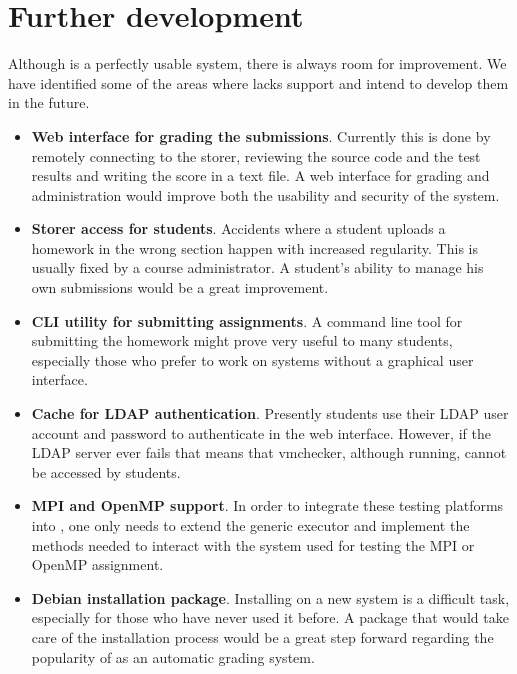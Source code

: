 \chapter{Further development}
\label{chapter:virt-devel}

Although \project is a perfectly usable system, there is always room for improvement.
We have identified some of the areas where \project lacks support and intend to
develop them in the future.

\begin{itemize}
\item {\bf Web interface for grading the submissions}. Currently this is done by
remotely connecting to the storer, reviewing the source code and the test results
and writing the score in a text file. A web interface for grading and administration
would improve both the usability and security of the system.
\item {\bf Storer access for students}. Accidents where a student uploads a
homework in the wrong section happen with increased regularity. This is usually
fixed by a course administrator. A student's ability to manage his own submissions
would be a great improvement.
\item {\bf CLI utility for submitting assignments}. A command line tool for 
submitting the homework might prove very useful to many students, especially
those who prefer to work on systems without a graphical user interface.
\item {\bf Cache for LDAP authentication}. Presently students use their
LDAP user account and password to authenticate in the web interface. However,
if the LDAP server ever fails that means that vmchecker, although running,
cannot be accessed by students.
\item {\bf MPI and OpenMP support}. In order to integrate these testing platforms
into \project, one only needs to extend the generic executor and implement
the methods needed to interact with the system used for testing the MPI or OpenMP
assignment.
\item {\bf Debian installation package}. Installing \project on a new system
is a difficult task, especially for those who have never used it before. 
A package that would take care of the installation process would be a great 
step forward regarding the popularity of \project as an automatic grading system.
\end{itemize}
